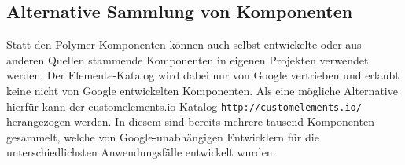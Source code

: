 \subsection{Alternative Sammlung von Komponenten}\label{alternative-sammlung-von-komponenten}

Statt den Polymer-Komponenten können auch selbst entwickelte oder aus anderen Quellen stammende Komponenten in eigenen Projekten verwendet werden. Der Elemente-Katalog wird dabei nur von Google vertrieben und erlaubt keine nicht von Google entwickelten Komponenten. Als eine mögliche Alternative hierfür kann der customelements.io-Katalog \texttt{http://customelements.io/} herangezogen werden. In diesem sind bereits mehrere tausend Komponenten gesammelt, welche von Google-unabhängigen Entwicklern für die unterschiedlichsten Anwendungsfälle entwickelt wurden.


